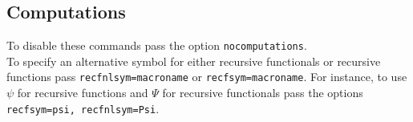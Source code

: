 \documentclass[leqno,11pt]{amsart}
\begin{document}


\subsection{Computations}
To disable these commands pass the option \verb=nocomputations=. \\  To specify an alternative symbol for either recursive functionals or recursive functions pass  \verb!recfnlsym=macroname! or \verb!recfsym=macroname!.  For instance, to use \( \psi \) for recursive functions and \( \Psi \) for recursive functionals pass the options \verb!recfsym=psi, recfnlsym=Psi!.  
\end{document}
